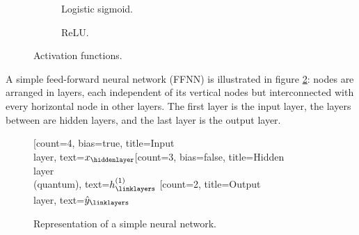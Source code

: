 \documentclass[12pt, a4paper]{article}
\begin{document}
\begin{figure}[h]
    \centering
    \begin{subfigure}[t]{0.4\textwidth}
        \caption{Logistic sigmoid.}
    \end{subfigure}
    \begin{subfigure}[t]{0.4\textwidth}
        \caption{ReLU.}
    \end{subfigure}
    \caption{Activation functions.}
    \label{fig:activation_functions}
\end{figure}
A simple feed-forward neural network (FFNN) is illustrated in figure \ref{fig:net}: nodes are arranged in layers, each independent of its vertical nodes but interconnected with every horizontal node in other layers. The first layer is the input layer, the layers between are hidden layers, and the last layer is the output layer.
\begin{figure}[htp]
    \centering
    \begin{neuralnetwork}[height=5]
        \newcommand{\x}[2]{$x_#2$}
        \newcommand{\y}[2]{$\hat{y}_#2$}
        \newcommand{\hfirst}[2]{\small $h^{(1)}_#2$}
        \newcommand{\hsecond}[2]{\small $h^{(2)}_#2$}
        [count=4, bias=true, title=Input\\layer, text=\x]
        \hiddenlayer[count=3, bias=false, title=Hidden\\layer\\(quantum), text=\hfirst] \linklayers
        \outputlayer[count=2, title=Output\\layer, text=\y] \linklayers
    \end{neuralnetwork}
    \caption{Representation of a simple neural network.}
    \label{fig:net}
\end{figure}
\end{document}
